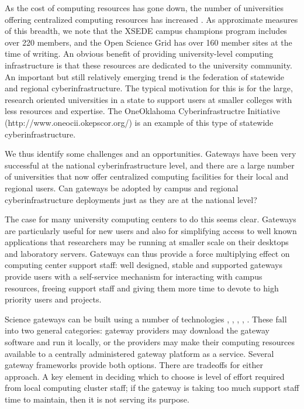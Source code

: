 \documentclass[sigconf]{acmart}
\begin{document}
As the cost of computing resources has gone down, the number of universities offering centralized computing resources has increased \cite{hacker2007making}. As approximate measures of this breadth, we note that the XSEDE campus champions program includes over 220 members, and the Open Science Grid has over 160 member sites at the time of writing. An obvious benefit of providing university-level computing infrastructure is that these resources are dedicated to the university community. An important but still relatively emerging trend is the federation of statewide and regional cyberinfrastructure. The typical motivation for this is for the large, research oriented universities in a state to support users at smaller colleges with less resources and expertise. The OneOklahoma Cyberinfrastructre Initiative (http://www.oneocii.okepscor.org/) is an example of this type of statewide cyberinfrastructure.

We thus identify some challenges and an opportunities. Gateways have been very successful at the national cyberinfrastructure level, and there are a large number of universities that now offer centralized computing facilities for their local and regional users. Can gateways be adopted by campus and regional cyberinfrastructure deployments just as they are at the national level?

The case for many university computing centers to do this seems clear. Gateways are particularly useful for new users and also for simplifying access to well known applications that researchers may be running at smaller scale on their desktops and laboratory servers.  Gateways can thus provide a force multiplying effect on computing center support staff: well designed, stable and supported gateways provide users with a self-service mechanism for interacting with campus resources, freeing support staff and giving them more time to devote to high priority users and projects.

Science gateways can be built using a number of technologies \cite{mclennan2010hubzero}, \cite{dooley2012software}, \cite{marru2011apache}, \cite{goecks2010galaxy}, \cite{kluyver2016jupyter}.  These fall into two general categories: gateway providers may download the gateway software and run it locally, or the providers may make their computing resources available to a centrally administered gateway platform as a service. Several gateway frameworks provide both options.  There are tradeoffs for either approach. A key element in deciding which to choose is level of effort required from local computing cluster staff; if the gateway is taking too much support staff time to maintain, then it is not serving its purpose.
\end{document}
